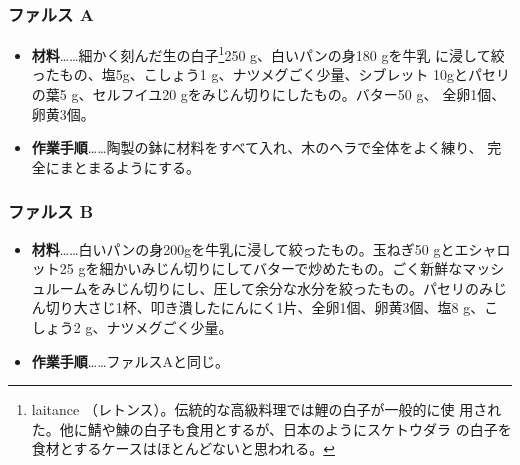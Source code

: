 \begin{recette}
\hypertarget{farces-poissons-braises-a}{%
\subsubsection{ファルス A}\label{farces-poissons-braises-a}}



\begin{itemize}
\item
  \textbf{材料}\ldots{}\ldots{}細かく刻んだ生の白子\footnote{laitance
    （レトンス）。伝統的な高級料理では鯉の白子が一般的に使
    用された。他に鯖や鰊の白子も食用とするが、日本のようにスケトウダラ
    の白子を食材とするケースはほとんどないと思われる。}250
  g、白いパンの身180 gを牛乳 に浸して絞ったもの、塩5g、こしょう1
  g、ナツメグごく少量、シブレット 10gとパセリの葉5 g、セルフイユ20
  gをみじん切りにしたもの。バター50 g、 全卵1個、卵黄3個。
\item
  \textbf{作業手順}\ldots{}\ldots{}陶製の鉢に材料をすべて入れ、木のヘラで全体をよく練り、
  完全にまとまるようにする。
\end{itemize}

\hypertarget{farces-poissons-braises-b}{%
\subsubsection{ファルス B}\label{farces-poissons-braises-b}}



\begin{itemize}
\item
  \textbf{材料}\ldots{}\ldots{}白いパンの身200gを牛乳に浸して絞ったもの。玉ねぎ50
  gとエシャロット25
  gを細かいみじん切りにしてバターで炒めたもの。ごく新鮮なマッシュルームをみじん切りにし、圧して余分な水分を絞ったもの。パセリのみじん切り大さじ1杯、叩き潰したにんにく1片、全卵1個、卵黄3個、塩8
  g、こしょう2 g、ナツメグごく少量。
\item
  \textbf{作業手順}\ldots{}\ldots{}ファルスAと同じ。
\end{itemize}
\end{recette}

